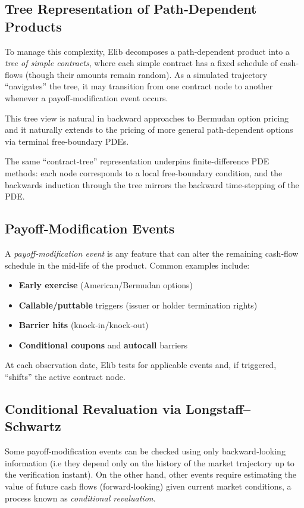 \documentclass[11pt]{article}
\begin{document}
\subsection{Tree Representation of Path‐Dependent Products}
To manage this complexity, Elib decomposes a path‐dependent product into a \emph{tree of simple contracts}, where each simple contract has a fixed schedule of cash‐flows (though their amounts remain random).  As a simulated trajectory “navigates” the tree, it may transition from one contract node to another whenever a payoff‐modification event occurs.

\begin{remark}
This tree view is natural in backward approaches to Bermudan option pricing and it naturally extends to the pricing of more general path-dependent options via terminal free-boundary PDEs.

The same “contract-tree” representation underpins finite-difference PDE methods: each node corresponds to a local free-boundary condition, and the backwards induction through the tree mirrors the backward time-stepping of the PDE.
\end{remark}

\subsection{Payoff‐Modification Events}
A \emph{payoff‐modification event} is any feature that can alter the remaining cash‐flow schedule in the mid‐life of the product.  Common examples include:
\begin{itemize}
  \item \textbf{Early exercise} (American/Bermudan options)  
  \item \textbf{Callable/puttable} triggers (issuer or holder termination rights)  
  \item \textbf{Barrier hits} (knock‐in/knock‐out)  
  \item \textbf{Conditional coupons} and \textbf{autocall} barriers  
\end{itemize}
At each observation date, Elib tests for applicable events and, if triggered, “shifts” the active contract node.

\subsection{Conditional Revaluation via Longstaff–Schwartz}
Some payoff-modification events can be checked using only backward‐looking information  (i.e they depend only on the history of the market trajectory up to the verification instant). On the other hand, other events require estimating the value of future cash flows (forward‐looking) given current market conditions, a process known as \emph{conditional revaluation}. 
\end{document}
